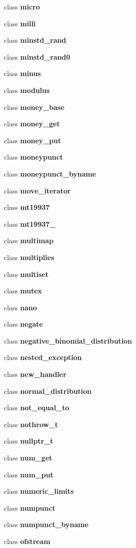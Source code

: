 \begin{DoxyCompactItemize}
\item 
class \textbf{ micro}
\item 
class \textbf{ milli}
\item 
class \textbf{ minstd\+\_\+rand}
\item 
class \textbf{ minstd\+\_\+rand0}
\item 
class \textbf{ minus}
\item 
class \textbf{ modulus}
\item 
class \textbf{ money\+\_\+base}
\item 
class \textbf{ money\+\_\+get}
\item 
class \textbf{ money\+\_\+put}
\item 
class \textbf{ moneypunct}
\item 
class \textbf{ moneypunct\+\_\+byname}
\item 
class \textbf{ move\+\_\+iterator}
\item 
class \textbf{ mt19937}
\item 
class \textbf{ mt19937\+\_}
\item 
class \textbf{ multimap}
\item 
class \textbf{ multiplies}
\item 
class \textbf{ multiset}
\item 
class \textbf{ mutex}
\item 
class \textbf{ nano}
\item 
class \textbf{ negate}
\item 
class \textbf{ negative\+\_\+binomial\+\_\+distribution}
\item 
class \textbf{ nested\+\_\+exception}
\item 
class \textbf{ new\+\_\+handler}
\item 
class \textbf{ normal\+\_\+distribution}
\item 
class \textbf{ not\+\_\+equal\+\_\+to}
\item 
class \textbf{ nothrow\+\_\+t}
\item 
class \textbf{ nullptr\+\_\+t}
\item 
class \textbf{ num\+\_\+get}
\item 
class \textbf{ num\+\_\+put}
\item 
class \textbf{ numeric\+\_\+limits}
\item 
class \textbf{ numpunct}
\item 
class \textbf{ numpunct\+\_\+byname}
\item 
class \textbf{ ofstream}
\item 

\end{DoxyCompactItemize}
